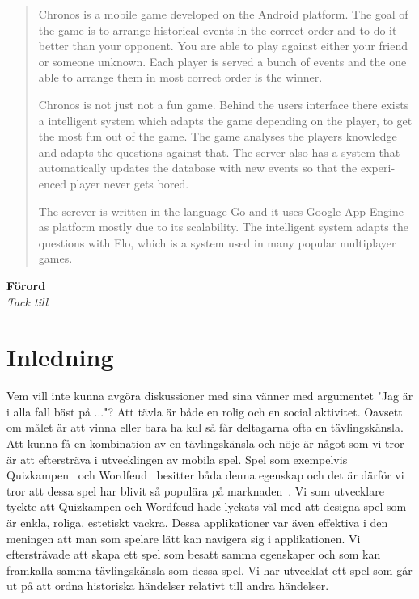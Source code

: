 \documentclass[a4paper, 11pt]{article}
\begin{document}
\begin{otherlanguage}{english}
\begin{abstract}
Chronos is a mobile game developed on the Android platform. The goal of the game is to arrange historical events in the correct order and to do it better than your opponent. You are able to play against either your friend or someone unknown. Each player is served a bunch of events and the one able to arrange them in most correct order is the winner.

Chronos is not just not a fun game. Behind the users interface there exists a intelligent system which adapts the game depending on the player, to get the most fun out of the game. The game analyses the players knowledge and adapts the questions against that. The server also has a system that automatically updates the database with new events so that the experienced player never gets bored. 

The serever is written in the language Go and it uses Google App Engine as platform mostly due to its scalability. The intelligent system adapts the questions with Elo, which is a system used in many popular multiplayer games.
\end{abstract}
\end{otherlanguage}

\newpage

\begin{center}
\textbf{Förord}\\
\textit{Tack till}
\end{center}
\newpage
\tableofcontents
\pagebreak




\section{Inledning}
Vem vill inte kunna avgöra diskussioner med sina vänner med argumentet "Jag är i alla fall bäst på ..."? 
Att tävla är både en rolig och en social aktivitet. Oavsett om målet är att vinna eller bara ha kul så får deltagarna ofta en tävlingskänsla. Att kunna få en kombination av en tävlingskänsla och nöje är något som vi tror är att eftersträva i utvecklingen av mobila spel. Spel som exempelvis Quizkampen~\cite{quiz} och Wordfeud~\cite{wordfeud} besitter båda denna egenskap och det är därför vi tror att dessa spel har blivit så populära på marknaden~\cite{appsalesrating}. Vi som utvecklare tyckte att Quizkampen och Wordfeud hade lyckats väl med att designa spel som är enkla, roliga, estetiskt vackra. Dessa applikationer var även effektiva i den meningen att man som spelare lätt kan navigera sig i applikationen. Vi eftersträvade att skapa ett spel som besatt samma egenskaper och som kan framkalla samma tävlingskänsla som dessa spel. Vi har utvecklat ett spel som går ut på att ordna historiska händelser relativt till andra händelser. 
\end{document}
